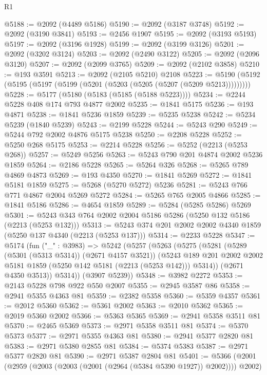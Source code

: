 \begin{lexlean}{R1}
\begin{coremodule}
@5188 := @2092 (@4489 @5186)
@5190 := @2092 (@3187 @3748)
@5192 := @2092 (@3190 @3841)
@5193 := @2456 @1907
@5195 := @2092 (@3193 @5193)
@5197 := @2092 (@3196 @1928)
@5199 := @2092 (@3199 @3126)
@5201 := @2092 (@3202 @3124)
@5203 := @2092 (@2490 @3122)
@5205 := @2092 (@2096 @3120)
@5207 := @2092 (@2099 @3765)
@5209 := @2092 (@2102 @3858)
@5210 := @193 @3591
@5213 := @2092 (@2105 @5210) @2108
@5223 := @5190 (@5192 (@5195 (@5197 (@5199 (@5201 (@5203 (@5205 (@5207 (@5209 @5213)))))))))
@5228 := @5177 (@5180 (@5183 (@5185 (@5188 @5223))))
@5234 := @2244 @5228 @408 @174 @793 @4877 @2002
@5235 := @1841 @5175
@5236 := @193 @4871
@5238 := @1841 @5236 @1859
@5239 := @5235 @5238
@5242 := @5234 @5239 (@1840 @5239)
@5243 := @2199 @5228
@5244 := @5243 @290
@5249 := @5244 @792 @2002 @4876 @5175 @5238
@5250 := @2208 @5228
@5252 := @5250 @268 @5175
@5253 := @2214 @5228
@5256 := @5252 (@2213 (@5253 @268))
@5257 := @5249 @5256
@5263 := @5243 @790 @201 @4874 @2002 @5236 @1859
@5264 := @2186 @5228
@5265 := @5264 @326
@5268 := @5265 @789 @4869 @4873
@5269 := @193 @4350
@5270 := @1841 @5269
@5272 := @1841 @5181 @1859
@5275 := @5268 (@5270 @5272) @5236
@5281 := @5243 @766 @771 @4867 @2004 @5269 @5272
@5284 := @5265 @765 @2005 @4866
@5285 := @1841 @5186
@5286 := @4654 @1859
@5289 := @5284 (@5285 @5286) @5269
@5301 := @5243 @343 @764 @2002 @2004 @5186 @5286 (@5250 @132 @5186 (@2213 (@5253 @132)))
@5313 := @5243 @374 @201 @2002 @2002 @4340 @1859 (@5250 @137 @4340 (@2213 (@5253 @137)))
@5314 := @2233 @5228
@5347 := @5174
    (fun ("_" : @3983) =>
    @5242
      (@5257
        (@5263
          (@5275
            (@5281
              (@5289 (@5301 (@5313 @5314)) (@2671 @4157 @3521))
              (@5243
                @189
                @201
                @2002
                @2002
                @5181
                @1859
                (@5250 @142 @5181 (@2213 (@5253 @142)))
                @5314))
            (@2671 @4350 @3513))
          @5314))
      (@3907 @5239))
@5348 := @3982 @2272
@5353 := @2143 @5228 @798 @922 @550 @2007
@5355 := @2945 @3587 @86
@5358 := @2941 @5355 @4363 @81
@5359 := @2382 @5358
@5360 := @5359 @4357
@5361 := @2012 @5360
@5362 := @5361 @2002
@5363 := @2010 @5362
@5365 := @2019 @5360 @2002
@5366 := @5363 @5365
@5369 := @2941 @5358 @3511 @81
@5370 := @2465 @5369
@5373 := @2971 @5358 @3511 @81
@5374 := @5370 @5373
@5377 := @2971 @5355 @4363 @81
@5380 := @2941 @5377 @2820 @81
@5383 := @2971 @5380 @2855 @81
@5384 := @5374 @5383
@5387 := @2971 @5377 @2820 @81
@5390 := @2971 @5387 @2804 @81
@5401 := @5366 (@2001 (@2959 (@2003 (@2003 (@2001 (@2964 (@5384 @5390 @1927)) @2002)))) @2002)

\end{coremodule}
\end{lexlean}
